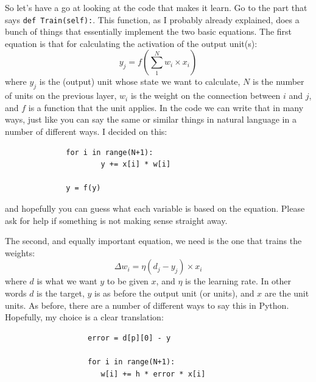 \documentclass[a4paper,10pt]{article}
\begin{document}
So let's have a go at looking at the code that makes it learn. Go to the part that says \texttt{def Train(self):}. This function, as I probably already explained, does a bunch of things that essentially implement the two basic equations. The first equation is that for calculating the activation of the output unit(s): 
\begin{equation}
y_j = f \left( \sum_1^N w_i \times x_i \right)
\end{equation} 
where $y_j$ is the (output) unit whose state we want to calculate, $N$ is the number of units on the previous layer, $w_{i}$ is the weight on the connection between $i$ and $j$, and $f$ is a function that the unit applies. In the code we can write that in many ways, just like you can say the same or similar things in natural language in a number of different ways. I decided on this:      \begin{verbatim}
              for i in range(N+1): 
                      y += x[i] * w[i]
                      
              y = f(y)
\end{verbatim} and hopefully you can guess what each variable is based on the equation. Please ask for help if something is not making sense straight away.

The second, and equally important equation, we need is the one that trains the weights:
\begin{equation}
\Delta w_i = \eta  ( d_j - y_j ) \times x_{i}
\end{equation} 
where $d$ is what we want $y$ to be given $x$, and $\eta$ is the learning rate. In other words $d$ is the target, $y$ is as before the output unit (or units), and $x$ are the unit units. As before, there are a number of different ways to say this in Python. Hopefully, my choice is a clear translation:
\begin{verbatim}
                   error = d[p][0] - y
                   
                   for i in range(N+1): 
                      w[i] += h * error * x[i]\end{verbatim} 
\end{document}
